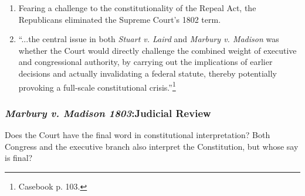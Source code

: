 \begin{enumerate}
\begin{enumerate}
        behavior'' clause presumably gave tenure for life.\footnote{U.S. 
        Const. art. III, \S\ 1.}
        \item Was it constitutional to assign Supreme Court justices to duty 
        on a lower court?
    \end{enumerate}
    \item Fearing a challenge to the constitutionality of the Repeal Act, the 
    Republicans eliminated the Supreme Court's 1802 term.
    \item ``...the central issue in both \emph{Stuart v. Laird} and 
    \emph{Marbury v. Madison} was whether the Court would directly challenge 
    the combined weight of executive and congressional authority, by carrying 
    out the implications of earlier decisions and actually invalidating a 
    federal statute, thereby potentially provoking a full-scale constitutional 
    crisis.''\footnote{Casebook p. 103.}
\end{enumerate}

\subsubsection{\emph{Marbury v. Madison 1803}:Judicial Review}

Does the Court have the final word in constitutional interpretation? Both 
Congress and the executive branch also interpret the Constitution, but whose 
say is final?

